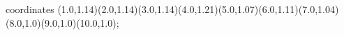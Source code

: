 					coordinates { (1.0,1.14)(2.0,1.14)(3.0,1.14)(4.0,1.21)(5.0,1.07)(6.0,1.11)(7.0,1.04)(8.0,1.0)(9.0,1.0)(10.0,1.0)};